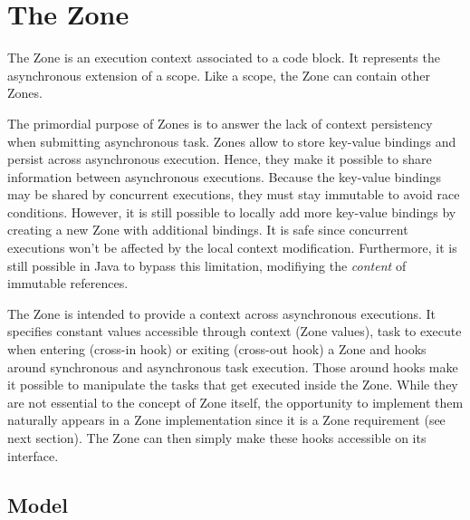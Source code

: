 
\chapter{The Zone}
\label{ch:zone}

The Zone is an execution context associated to a code block. It represents the asynchronous extension of a scope. Like a scope, the Zone can contain other Zones.


The primordial purpose of Zones is to answer the lack of context persistency when submitting asynchronous task. Zones allow to store key-value bindings and persist across asynchronous execution. Hence, they make it possible to share information between asynchronous executions. Because the key-value bindings may be shared by concurrent executions, they must stay immutable to avoid race conditions. However, it is still possible to locally add more key-value bindings by creating a new Zone with additional bindings. It is safe since concurrent executions won't be affected by the local context modification. Furthermore, it is still possible in Java to bypass this limitation, modifiying the \emph{content} of immutable references.

The Zone is intended to provide a context across asynchronous executions. It specifies constant values accessible through context (Zone values), task to execute when entering (cross-in hook) or exiting (cross-out hook) a Zone and hooks around synchronous and asynchronous task execution. Those around hooks make it possible to manipulate the tasks that get executed inside the Zone. While they are not essential to the concept of Zone itself, the opportunity to implement them naturally appears in a Zone implementation since it is a Zone requirement (see next section). The Zone can then simply make these hooks accessible on its interface.

\section{Model}

